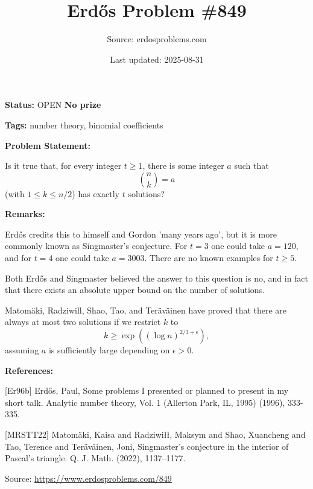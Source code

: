 \documentclass{article}
\title{Erd\H{o}s Problem \#849}
\date{Last updated: 2025-08-31}
\author{Source: erdosproblems.com}
\begin{document}
\maketitle

\noindent\textbf{Status:} OPEN \quad \textbf{No prize}

\noindent\textbf{Tags:} number theory, binomial coefficients

\medskip
\noindent\textbf{Problem Statement:}

Is it true that, for every integer $t\geq 1$, there is some integer $a$ such that\[\binom{n}{k}=a\](with $1\leq k\leq n/2$) has exactly $t$ solutions?

\bigskip
\noindent\textbf{Remarks:}

Erd\H{o}s \cite{Er96b} credits this to himself and Gordon 'many years ago', but it is more commonly known as Singmaster's conjecture. For $t=3$ one could take $a=120$, and for $t=4$ one could take $a=3003$. There are no known examples for $t\geq 5$.

Both Erd\H{o}s and Singmaster believed the answer to this question is no, and in fact that there exists an absolute upper bound on the number of solutions.

Matomäki, Radziwill, Shao, Tao, and Teräväinen \cite{MRSTT22} have proved that there are always at most two solutions if we restrict $k$ to\[k\geq \exp((\log n)^{2/3+\epsilon}),\]assuming $a$ is sufficiently large depending on $\epsilon>0$.

\bigskip
\noindent\textbf{References:}

[Er96b] Erd\H{o}s, Paul, Some problems I presented or planned to present in my short
talk. Analytic number theory, Vol. 1 (Allerton Park, IL, 1995) (1996), 333-335.
 
 [MRSTT22] Matom\"{a}ki, Kaisa and Radziwi\l\l, Maksym and Shao, Xuancheng
and Tao, Terence and Ter\"{a}v\"{a}inen, Joni, Singmaster's conjecture in the interior of {P}ascal's
triangle. Q. J. Math. (2022), 1137--1177.

\bigskip
\noindent\small{Source: \url{https://www.erdosproblems.com/849}}
\end{document}

